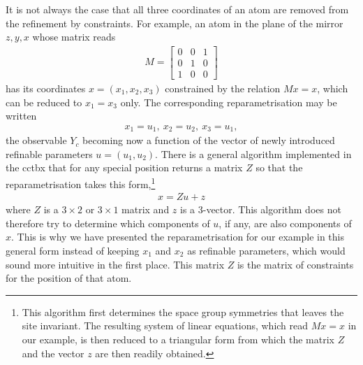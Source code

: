 \documentclass[pdf]{iucr}
\begin{document}
It is not always the case that all three coordinates of an atom are removed from the refinement by constraints. For example, an atom in the plane of the mirror $z,y,x$ whose matrix reads
\begin{align}
M=\begin{bmatrix}
0 & 0 & 1\\
0 & 1 & 0\\
1 & 0 & 0
\end{bmatrix}
\end{align}
has its coordinates $x=(x_1, x_2, x_3)$ constrained by the relation $M x = x$, which can be reduced to $x_1 = x_3$ only. The corresponding reparametrisation may be written
\begin{align}
x_1 = u_1,\ x_2 = u_2,\ x_3 = u_1,
\label{eqn:specialposexamplereparam}
\end{align}
the observable $Y_c$ becoming now a function of the vector of newly introduced refinable parameters $u = (u_1, u_2)$. There is a general algorithm implemented in the cctbx that for any special position returns a matrix $Z$ so that the reparametrisation takes this form,\footnote{This algorithm first determines the space group symmetries that leaves the site invariant. The resulting system of linear equations, which read $M x = x$ in our example, is then reduced to a triangular form from which the matrix $Z$ and the vector $z$ are then readily obtained.}
\begin{align}
x = Z u + z
\end{align}
where $Z$ is a $3 \times 2$ or $3 \times 1$ matrix and $z$ is a 3-vector. This algorithm does not therefore try to determine which components of $u$, if any, are also components of $x$. This is why we have presented the reparametrisation for our example in this general form instead of keeping $x_1$ and $x_2$ as refinable parameters, which would sound more intuitive in the first place.
This matrix $Z$ is the matrix of constraints for the position of that atom. 
\end{document}
